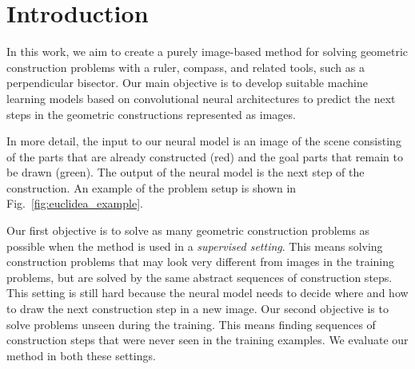 \section{Introduction}
In this work, we aim to create a purely image-based method for solving geometric construction problems with a ruler, compass, and related tools, such as a perpendicular bisector.
Our main objective is to develop suitable machine learning models based on convolutional neural architectures to predict the next steps in the geometric constructions represented as images.

In more detail, the input to our neural model is an image of the scene consisting of the parts that are already constructed (red) and the goal parts that remain to be drawn (green).
The output of the neural model is the next step of the construction.
An example of the problem setup is shown in Fig.~\ref{fig:euclidea_example}.

Our first objective is to solve as many geometric construction problems as possible when the method is used in a \emph{supervised setting}. This means solving construction problems that may look very different from images in the training problems, but are solved by the same abstract sequences of construction steps. This setting is still hard because the neural model needs to decide where and how to draw the next construction step in a new image.
Our second objective is to solve problems unseen during the training. This means finding sequences of construction steps that were never seen in the training examples. We evaluate our method in both these settings.

